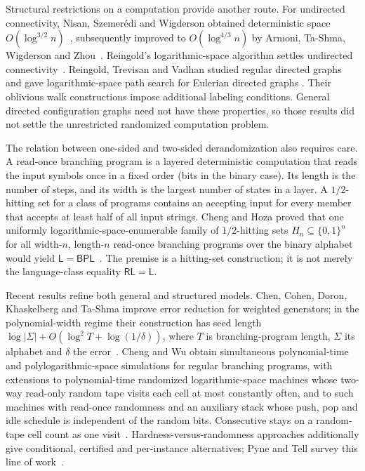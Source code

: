 Structural restrictions on a computation provide another route.
For undirected connectivity, Nisan, Szemer\'edi and Wigderson obtained
deterministic space $O(\log^{3/2}n)$~\cite{NisanSzemerediWigderson1992},
subsequently improved to $O(\log^{4/3}n)$ by Armoni, Ta-Shma,
Wigderson and Zhou~\cite{ArmoniTaShmaWigdersonZhou2000}.
Reingold's logarithmic-space algorithm settles undirected
connectivity~\cite{Reingold2005,Reingold2008}.
Reingold, Trevisan and Vadhan studied regular directed graphs and gave
logarithmic-space path search for Eulerian directed graphs
\cite{RTV2006}. Their oblivious walk constructions impose additional
labeling conditions. General directed configuration graphs need not
have these properties, so those results did not settle the unrestricted
randomized computation problem.

The relation between one-sided and two-sided derandomization also
requires care.
A read-once branching program is a layered deterministic computation
that reads the input symbols once in a fixed order (bits in the binary
case). Its length is the number of steps,
and its width is the largest number of states in a layer.
A $1/2$-hitting set for a class of programs contains an accepting input
for every member that accepts at least half of all input strings.
Cheng and Hoza proved that one uniformly logarithmic-space-enumerable
family of $1/2$-hitting sets $H_n\subseteq\{0,1\}^n$ for all width-$n$,
length-$n$ read-once branching programs over the binary alphabet would yield
$\mathsf L=\mathsf{BPL}$~\cite[Theorem~1.3]{ChengHoza2022}.
The premise is a hitting-set construction; it is not merely the
language-class equality $\mathsf{RL}=\mathsf L$.

Recent results refine both general and structured models.
Chen, Cohen, Doron, Khaskelberg and Ta-Shma improve error reduction for
weighted generators; in the polynomial-width regime their construction
has seed length $\log|\Sigma|+O(\log^2 T+\log(1/\delta))$, where
$T$ is branching-program length, $\Sigma$ its alphabet and $\delta$
the error~\cite{ChenCohenDoronKhaskelbergTaShma2026}.
Cheng and Wu obtain simultaneous polynomial-time and polylogarithmic-space
simulations for regular branching programs, with extensions to polynomial-time
randomized logarithmic-space machines whose two-way read-only random tape
visits each cell at most constantly often, and to such machines with read-once randomness
and an auxiliary stack whose push, pop and idle schedule is independent
of the random bits. Consecutive stays on a random-tape cell count as one
visit~\cite[Theorems~5--6]{ChengWu2026SC}.
Hardness-versus-randomness approaches additionally give conditional,
certified and per-instance alternatives; Pyne and Tell survey this
line of work~\cite{PyneTell2026}.


